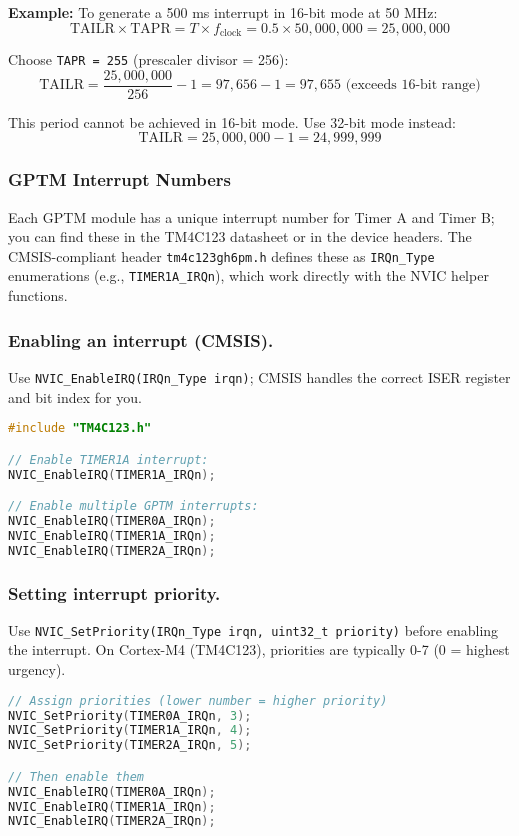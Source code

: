 \noindent
\textbf{Example:} To generate a 500 ms interrupt in 16-bit mode at 50 MHz:
\[
\text{TAILR} \times \text{TAPR} = T \times f_{\text{clock}} = 0.5 \times 50{,}000{,}000 = 25{,}000{,}000
\]

\noindent
Choose \texttt{TAPR = 255} (prescaler divisor = 256):
\[
\text{TAILR} = \frac{25{,}000{,}000}{256} - 1 = 97{,}656 - 1 = 97{,}655 \text{ (exceeds 16-bit range)}
\]

\noindent
This period cannot be achieved in 16-bit mode. Use 32-bit mode instead:
\[
\text{TAILR} = 25{,}000{,}000 - 1 = 24{,}999{,}999
\]

\subsubsection{GPTM Interrupt Numbers}
Each GPTM module has a unique interrupt number for Timer A and Timer B; you can find these in the TM4C123 datasheet or in the device headers. The CMSIS-compliant header \texttt{tm4c123gh6pm.h} defines these as \texttt{IRQn\_Type} enumerations (e.g., \texttt{TIMER1A\_IRQn}), which work directly with the NVIC helper functions.

\subsubsection*{Enabling an interrupt (CMSIS).}
Use \texttt{NVIC\_EnableIRQ(IRQn\_Type irqn)}; CMSIS handles the correct ISER register and bit index for you.
\begin{lstlisting}[language=C]
#include "TM4C123.h"

// Enable TIMER1A interrupt:
NVIC_EnableIRQ(TIMER1A_IRQn);

// Enable multiple GPTM interrupts:
NVIC_EnableIRQ(TIMER0A_IRQn);
NVIC_EnableIRQ(TIMER1A_IRQn);
NVIC_EnableIRQ(TIMER2A_IRQn);
\end{lstlisting}

\subsubsection*{Setting interrupt priority.}
Use \texttt{NVIC\_SetPriority(IRQn\_Type irqn, uint32\_t priority)} before enabling the interrupt. 
On Cortex-M4 (TM4C123), priorities are typically 0-7 (0 = highest urgency).
\begin{lstlisting}[language=C]
// Assign priorities (lower number = higher priority)
NVIC_SetPriority(TIMER0A_IRQn, 3);
NVIC_SetPriority(TIMER1A_IRQn, 4);
NVIC_SetPriority(TIMER2A_IRQn, 5);

// Then enable them
NVIC_EnableIRQ(TIMER0A_IRQn);
NVIC_EnableIRQ(TIMER1A_IRQn);
NVIC_EnableIRQ(TIMER2A_IRQn);
\end{lstlisting}




